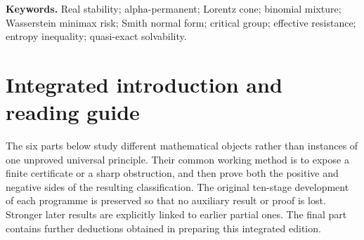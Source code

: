 \documentclass[11pt,a4paper]{article}
\theoremstyle{definition}\newtheorem{definition}[theorem]{Definition}
\theoremstyle{remark}\newtheorem{remark}[theorem]{Remark}
\numberwithin{equation}{section}
\begin{document}
\medskip
\noindent\textbf{Keywords.} Real stability; alpha-permanent; Lorentz cone; binomial mixture; Wasserstein minimax risk; Smith normal form; critical group; effective resistance; entropy inequality; quasi-exact solvability.
\clearpage{}
\begingroup\small\setlength{\parskip}{0pt}\tableofcontents\endgroup
\clearpage{}
\section*{Integrated introduction and reading guide}
The six parts below study different mathematical objects rather than instances of one unproved universal principle. Their common working method is to expose a finite certificate or a sharp obstruction, and then prove both the positive and negative sides of the resulting classification. The original ten-stage development of each programme is preserved so that no auxiliary result or proof is lost. Stronger later results are explicitly linked to earlier partial ones. The final part contains further deductions obtained in preparing this integrated edition.
\end{document}
